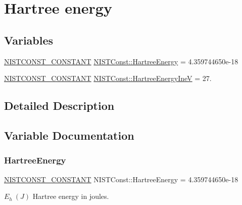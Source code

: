\hypertarget{group___n_i_s_t_const-_hartree_energy}{}\section{Hartree energy}
\label{group___n_i_s_t_const-_hartree_energy}
\subsection*{Variables}
\begin{DoxyCompactItemize}
\item 
\mbox{\hyperlink{_n_i_s_t_const_8hpp_a2b0fc1d7452373f816175dd86ce26729}{N\+I\+S\+T\+C\+O\+N\+S\+T\+\_\+\+C\+O\+N\+S\+T\+A\+NT}} \mbox{\hyperlink{group___n_i_s_t_const-_hartree_energy_ga07857f3a1e5865454cf529241763954f}{N\+I\+S\+T\+Const\+::\+Hartree\+Energy}} = 4.\+359744650e-\/18
\item 
\mbox{\hyperlink{_n_i_s_t_const_8hpp_a2b0fc1d7452373f816175dd86ce26729}{N\+I\+S\+T\+C\+O\+N\+S\+T\+\_\+\+C\+O\+N\+S\+T\+A\+NT}} \mbox{\hyperlink{group___n_i_s_t_const-_hartree_energy_ga1b1d1cd8f70b3b70ad1e4a3347aac2ae}{N\+I\+S\+T\+Const\+::\+Hartree\+Energy\+IneV}} = 27.
\end{DoxyCompactItemize}


\subsection{Detailed Description}


\subsection{Variable Documentation}
\mbox{\label{group___n_i_s_t_const-_hartree_energy_ga07857f3a1e5865454cf529241763954f}} 
\subsubsection{\texorpdfstring{Hartree\+Energy}{HartreeEnergy}}
{\footnotesize\ttfamily \mbox{\hyperlink{_n_i_s_t_const_8hpp_a2b0fc1d7452373f816175dd86ce26729}{N\+I\+S\+T\+C\+O\+N\+S\+T\+\_\+\+C\+O\+N\+S\+T\+A\+NT}} N\+I\+S\+T\+Const\+::\+Hartree\+Energy = 4.\+359744650e-\/18}

$E_h \ (J)$ Hartree energy in joules. \mbox{\label{group___n_i_s_t_const-_hartree_energy_ga1b1d1cd8f70b3b70ad1e4a3347aac2ae}} 
